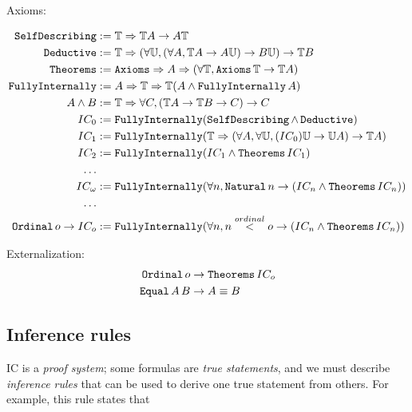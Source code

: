\documentclass{article}
\begin{document}
  Axioms:
  
  \begin{align*}
    \operatorname{\texttt{SelfDescribing}} &:= \mathbb{T} \Rightarrow \mathbb{T}A \to A\mathbb{T}\\
    \operatorname{\texttt{Deductive}} &:= \mathbb{T} \Rightarrow (\forall \mathbb{U}, (\forall A, \mathbb{T}A \to A\mathbb{U}) \to B\mathbb{U}) \to \mathbb{T}B\\
    \operatorname{\texttt{Theorems}} &:= \operatorname{\texttt{Axioms}} \Rightarrow A \Rightarrow (\forall \mathbb{T}, \operatorname{\texttt{Axioms}} \mathbb{T} \to \mathbb{T}A) \\ 
    \operatorname{\texttt{FullyInternally}} &:= A \Rightarrow \mathbb{T} \Rightarrow \mathbb{T} (A \wedge \operatorname{\texttt{FullyInternally}} A)\\
    A \wedge B &:= \mathbb{T} \Rightarrow \forall C, (\mathbb{T}A \to \mathbb{T}B \to C) \to C\\
    IC_0 &:= \operatorname{\texttt{FullyInternally}}(\operatorname{\texttt{SelfDescribing}} \wedge \operatorname{\texttt{Deductive}})\\
    IC_1 &:= \operatorname{\texttt{FullyInternally}}(\mathbb{T} \Rightarrow (\forall A, \forall \mathbb{U}, (IC_0)\mathbb{U} \to \mathbb{U}{A}) \to \mathbb{T}A)\\
    IC_2 &:= \operatorname{\texttt{FullyInternally}}(IC_1 \wedge \operatorname{\texttt{Theorems}} IC_1)\\
    \dots \\
    IC_\omega &:= \operatorname{\texttt{FullyInternally}}(\forall n, \operatorname{\texttt{Natural}} n \to (IC_n \wedge \operatorname{\texttt{Theorems}} IC_n))\\
    \dots \\
    \operatorname{\texttt{Ordinal}} o \to IC_o &:= \operatorname{\texttt{FullyInternally}}(\forall n, n \stackrel{ordinal}{<} o \to (IC_n \wedge \operatorname{\texttt{Theorems}} IC_n))\\
  \end{align*}
  
  Externalization:
  \begin{align*}
    \operatorname{\texttt{Ordinal}} o &\to \operatorname{\texttt{Theorems}} IC_o\\
    \operatorname{\texttt{Equal}} A\,B &\to A \equiv B\\
  \end{align*}
  
  
  \subsection{Inference rules}
  
  IC is a \emph{proof system}; some formulas are \emph{true statements}, and we must describe \emph{inference rules} that can be used to derive one true statement from others. For example, this rule states that
  
\end{document}

